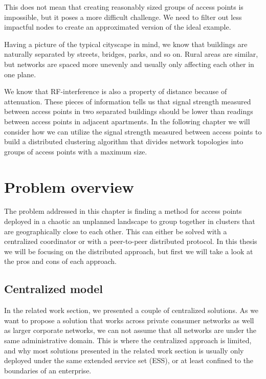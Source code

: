 This does not mean that creating reasonably sized groups of access points is impossible, but it poses a more difficult challenge. 
We need to filter out less impactful nodes to create an approximated version of the ideal example.

Having a picture of the typical cityscape in mind, we know that buildings are naturally separated by streets, bridges, parks, and so on. Rural areas are similar, but networks are spaced more unevenly and usually only affecting each other in one plane.

We know that RF-interference is also a property of distance because of attenuation.  These pieces of information tells us that signal strength measured
between access points in two separated buildings should be lower than readings between access points in adjacent apartments. In the following chapter we will consider how we can utilize the signal strength measured between access points to build a distributed clustering algorithm that divides network topologies into groups of access points with a maximum size. 


\section{Problem overview}
The problem addressed in this chapter is finding a method for access points deployed in a chaotic an unplanned landscape to group together in clusters that are geographically close to each other.
This can either be solved with a centralized coordinator or with a peer-to-peer distributed protocol. In this thesis we will be focusing on the distributed approach, but first we will take a look at the pros and cons of each approach.

\subsection{Centralized model}
In the related work section, we presented a couple of centralized solutions. As we want to propose a solution that works across private consumer networks as well as larger corporate networks,
we can not assume that all networks are under the same administrative domain. This is where the centralized approach is limited, and why most solutions presented in the related work section is usually only deployed under the same extended service set (ESS), or at least confined to the boundaries of an enterprise. 

